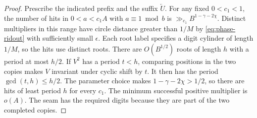 \begin{proof}
Prescribe the indicated prefix and the suffix \(\overleftarrow{U}\).
For any fixed \(0<c_1<1\), the number of hits in \(0<a<c_1A\)
with \(a\equiv1\bmod b\) is \(\gg_{c_1} B^{1-\gamma-2\chi}\).
Distinct multipliers in this range have circle distance greater
than \(1/M\) by \eqref{eq:phase-ridout} with sufficiently small
\(\epsilon\). Each root label specifies a digit cylinder of
length \(1/M\), so the hits use distinct roots. There are
\(O(B^{1/2})\) roots of length \(h\) with a period at most \(h/2\).
If \(V^2\) has a period \(t<h\), comparing positions in the two
copies makes \(V\) invariant under cyclic shift by \(t\). It then
has the period \(\gcd(t,h)\le h/2\). The parameter choice makes
\(1-\gamma-2\chi>1/2\), so there are hits of least period \(h\)
for every \(c_1\). The minimum successful positive multiplier
is \(o(A)\). The seam has the required digits because they are
part of the two completed copies.
\end{proof}

